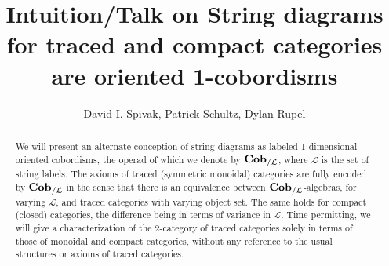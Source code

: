 \documentclass[11pt,oneside,article]{memoir}
\title{Intuition/Talk on String diagrams for traced and compact categories are oriented 1-cobordisms}
\author{David I. Spivak, Patrick Schultz, Dylan Rupel}
\date{\vspace{-3ex}}
\renewcommand{\LabSet}{\mathcal{L}}
\begin{document}
\firmlists*

\maketitle


\begin{abstract}
  We will present an alternate conception of string diagrams as labeled 1-dimensional oriented cobordisms, the operad of which we denote by $\LCob{\LabSet}$, where $\LabSet$ is the set of string labels. The axioms of traced (symmetric monoidal) categories are fully encoded by $\LCob{\LabSet}$ in the sense that there is an equivalence between $\LCob{\LabSet}$-algebras, for varying $\LabSet$, and traced categories with varying object set. The same holds for compact (closed) categories, the difference being in terms of variance in $\LabSet$. Time permitting, we will give a characterization of the 2-category of traced categories solely in terms of those of monoidal and compact categories, without any reference to the usual structures or axioms of traced categories. 
\end{abstract}
\end{document}
